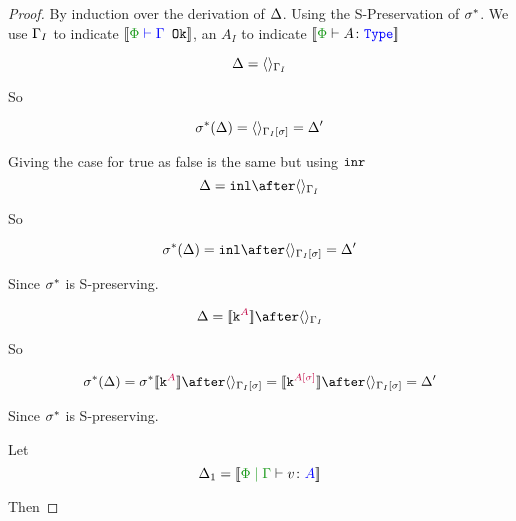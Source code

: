 \documentclass{report}
\begin{document}
\begin{framed}
    \begin{proof}
        
    By induction over the derivation of $\Delta$. Using the S-Preservation of $\sigma^*$. We use $\Gamma_I$ to indicate $\deno{\wellformedok{\P}{\G}}$, an $A_I$ to indicate $\deno{\typerelation{\P}{A}{\type}}$
    
    \case{\vunit}
    
    \begin{equation}
        \Delta = \langle\rangle_{\Gamma_I}
    \end{equation}
    
    So
    
    \begin{equation}
        \sigma^*(\Delta) = \langle\rangle_{\Gamma_I[\sigma]} = \Delta'
    \end{equation}
    
    \case{\vtrue, \vfalse}
    Giving the case for true as false is the same but using $\texttt{inr}$
    \begin{equation}
        \D = \inl\after\term{\G_I}
    \end{equation}
    
    So
    
    \begin{equation}
        \si\star(\D) = \inl\after \term{\G_I\ssi} = \D'
    \end{equation}
    
    Since $\sigma^*$ is S-preserving.
    
    \case{\vconst}
    
    \begin{equation}
        \D = \deno{\const{A}}\after\term{\G_I}
    \end{equation}
    
    So
    
    \begin{equation}
        \si\star(\D) = \si\star\deno{\const{A}}\after \term{\G_I\ssi}=\deno{\const{A\ssi}}\after \term{\G_I\ssi}  = \D'
    \end{equation}
    
    Since $\sigma^*$ is S-preserving.
    
    \case{\vsubtype}
    
    Let \begin{equation}
        \D_1 = \deno{\gpetyperelation{v}{A}}
    \end{equation}
    
    Then
    

\end{proof}
\end{framed}
\end{document}
